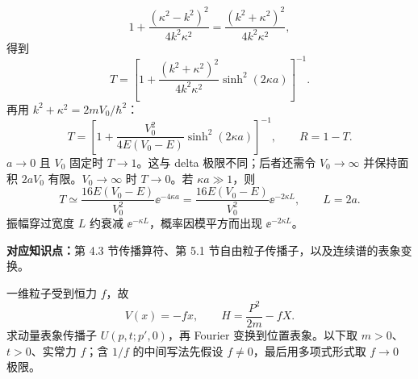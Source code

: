 \begin{checkedsolution}
\begin{equation}
  1+\frac{(\kappa^2-k^2)^2}{4k^2\kappa^2}
  =\frac{(k^2+\kappa^2)^2}{4k^2\kappa^2},
\end{equation}
得到
\begin{equation}
  T=
  \left[
    1+\frac{(k^2+\kappa^2)^2}{4k^2\kappa^2}
    \sinh^2(2\kappa a)
  \right]^{-1}.
\end{equation}
再用 $k^2+\kappa^2=2mV_0/\hbar^2$：
\begin{equation}
  \boxed{
  T=
  \left[
    1+\frac{V_0^2}{4E(V_0-E)}
    \sinh^2(2\kappa a)
  \right]^{-1}},
  \qquad
  \boxed{R=1-T}.
  \label{eq:QM-C05-S04-E02B-RT}
\end{equation}
$a\to0$ 且 $V_0$ 固定时 $T\to1$。这与 delta 极限不同；后者还需令 $V_0\to\infty$ 并保持面积 $2aV_0$ 有限。$V_0\to\infty$ 时 $T\to0$。若 $\kappa a\gg1$，则
\begin{equation}
  \boxed{
  T\simeq\frac{16E(V_0-E)}{V_0^2}\ee^{-4\kappa a}}
  =\frac{16E(V_0-E)}{V_0^2}\ee^{-2\kappa L},
  \qquad L=2a.
  \label{eq:QM-C05-S04-E02B-thick-limit}
\end{equation}
振幅穿过宽度 $L$ 约衰减 $\ee^{-\kappa L}$，概率因模平方而出现 $\ee^{-2\kappa L}$。
\end{checkedsolution}


\textbf{对应知识点：}第 4.3 节传播算符、第 5.1 节自由粒子传播子，以及连续谱的表象变换。

一维粒子受到恒力 $f$，故
\begin{equation}
  V(x)=-fx,
  \qquad
  H=\frac{P^2}{2m}-fX.
  \label{eq:QM-C05-S04-E03-hamiltonian}
\end{equation}
求动量表象传播子 $U(p,t;p',0)$，再 Fourier 变换到位置表象。以下取 $m>0$、$t>0$、实常力 $f$；含 $1/f$ 的中间写法先假设 $f\ne0$，最后用多项式形式取 $f\to0$ 极限。

